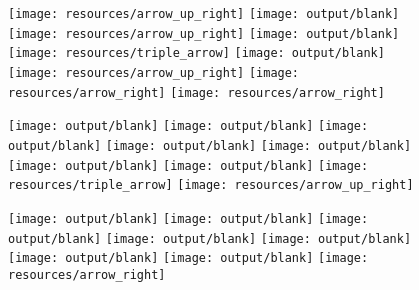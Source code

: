 \documentclass[11pt]{article}
\begin{document}
\begin{figure}[htbp]
\begin{minipage}[t]{0.125\textwidth}
  \end{minipage}%
  \begin{minipage}[t]{0.125\textwidth} %
    \centering
    \texttt{[image: resources/arrow\_up\_right]}
    \texttt{[image: output/blank]}
    \texttt{[image: resources/arrow\_up\_right]}
    \texttt{[image: output/blank]}
    \texttt{[image: resources/triple\_arrow]}
    \texttt{[image: output/blank]}
    \texttt{[image: resources/arrow\_up\_right]}
    \texttt{[image: resources/arrow\_right]}
    \texttt{[image: resources/arrow\_right]}

  \end{minipage}%
  \begin{minipage}[t]{0.125\textwidth} %
    \centering
    \vspace{-0.3871\linewidth} %
    \texttt{[image: output/blank]}
    \texttt{[image: output/blank]}
    \texttt{[image: output/blank]}
    \texttt{[image: output/blank]}
    \texttt{[image: output/blank]}
    \texttt{[image: output/blank]}
    \texttt{[image: output/blank]}
    \texttt{[image: resources/triple\_arrow]}
    \texttt{[image: resources/arrow\_up\_right]}

  \end{minipage}%
  \begin{minipage}[t]{0.125\textwidth} %
    \centering
    \texttt{[image: output/blank]}
    \texttt{[image: output/blank]}
    \texttt{[image: output/blank]}
    \texttt{[image: output/blank]}
    \texttt{[image: output/blank]}
    \texttt{[image: output/blank]}
    \texttt{[image: output/blank]}
    \texttt{[image: resources/arrow\_right]}

  \end{minipage}%
  \label{fig:figure}
\end{figure}
\end{document}
